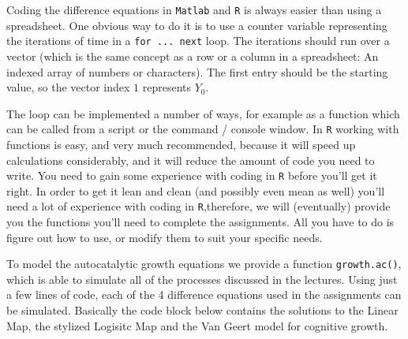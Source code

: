 \documentclass[]{book}
\begin{document}
Coding the difference equations in \texttt{Matlab} and \texttt{R} is
always easier than using a spreadsheet. One obvious way to do it is to
use a counter variable representing the iterations of time in a
\texttt{for\ ...\ next} loop. The iterations should run over a vector
(which is the same concept as a row or a column in a spreadsheet: An
indexed array of numbers or characters). The first entry should be the
starting value, so the vector index \(1\) represents \(Y_0\).

The loop can be implemented a number of ways, for example as a function
which can be called from a script or the command / console window. In
\texttt{R} working with functions is easy, and very much recommended,
because it will speed up calculations considerably, and it will reduce
the amount of code you need to write. You need to gain some experience
with coding in \texttt{R} before you'll get it right. In order to get it
lean and clean (and possibly even mean as well) you'll need a lot of
experience with coding in \texttt{R},therefore, we will (eventually)
provide you the functions you'll need to complete the assignments. All
you have to do is figure out how to use, or modify them to suit your
specific needs.

To model the autocatalytic growth equations we provide a function
\texttt{growth.ac()}, which is able to simulate all of the processes
discussed in the lectures. Using just a few lines of code, each of the 4
difference equations used in the assignments can be simulated. Basically
the code block below contains the solutions to the Linear Map, the
stylized Logisitc Map and the Van Geert model for cognitive growth.
\end{document}
